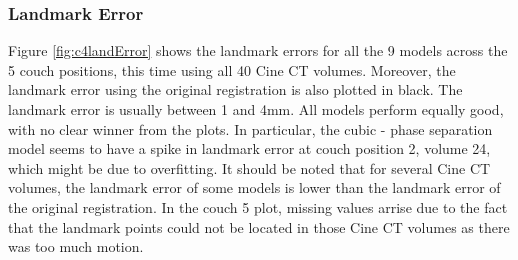 \documentclass[11pt,a4paper,oneside]{report}
\begin{document}
\subsubsection*{Landmark Error}

Figure \ref{fig:c4landError} shows the landmark errors for all the 9 models across the 5 couch positions, this time using all 40 Cine CT volumes. Moreover, the landmark error using the original registration is also plotted in black. The landmark error is usually between 1 and 4mm. All models perform equally good, with no clear winner from the plots. In particular, the cubic - phase separation model seems to have a spike in landmark error at couch position 2, volume 24, which might be due to overfitting. It should be noted that for several Cine CT volumes, the landmark error of some models is lower than the landmark error of the original registration. In the couch 5 plot, missing values arrise due to the fact that the landmark points could not be located in those Cine CT volumes as there was too much motion.
\end{document}
